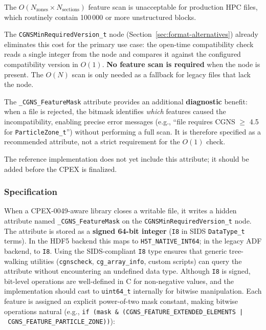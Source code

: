\documentclass[11pt,letterpaper]{article}
\begin{document}
The $O(N_{\mathrm{zones}} \times N_{\mathrm{sections}})$ feature scan
is unacceptable for production HPC files, which routinely contain
100\,000 or more unstructured blocks.

The \texttt{CGNSMinRequiredVersion\_t} node
(Section~\ref{sec:format-alternatives}) already eliminates this cost
for the primary use case: the open-time compatibility check reads a
single integer from the node and compares it against the
configured compatibility version in $O(1)$.  \textbf{No feature scan is required}
when the node is present.  The $O(N)$ scan is only needed as a
fallback for legacy files that lack the node.

The \texttt{\_CGNS\_FeatureMask} attribute provides an additional
\textbf{diagnostic} benefit: when a file is rejected, the bitmask
identifies \emph{which} features caused the incompatibility, enabling
precise error messages (e.g., ``file requires CGNS $\geq$ 4.5 for
\texttt{ParticleZone\_t}'') without performing a full scan.  It is
therefore specified as a recommended attribute, not a strict
requirement for the $O(1)$ check.

The reference implementation does not yet include this attribute; it
should be added before the CPEX is finalized.

\subsubsection{Specification}

When a CPEX-0049-aware library closes a writable file, it writes a
hidden attribute named \texttt{\_CGNS\_FeatureMask} on the
\texttt{CGNSMinRequiredVersion\_t} node.  The attribute is stored as a
\textbf{signed 64-bit integer} (\texttt{I8} in SIDS
\texttt{DataType\_t} terms).  In the HDF5 backend this maps to
\texttt{H5T\_NATIVE\_INT64}; in the legacy ADF backend, to
\texttt{I8}.  Using the SIDS-compliant \texttt{I8} type ensures that
generic tree-walking utilities (\texttt{cgnscheck},
\texttt{cg\_array\_info}, custom scripts) can query the attribute
without encountering an undefined data type.  Although \texttt{I8} is
signed, bit-level operations are well-defined in C for non-negative
values, and the implementation should cast to \texttt{uint64\_t}
internally for bitwise manipulation.  Each feature is assigned an
explicit power-of-two mask constant, making bitwise operations
natural (e.g., \texttt{if~(mask~\&~(CGNS\_FEATURE\_EXTENDED\_ELEMENTS~|~CGNS\_FEATURE\_PARTICLE\_ZONE))}):
\end{document}
